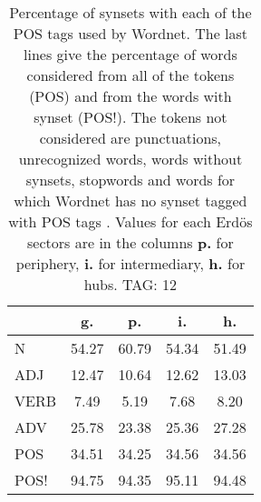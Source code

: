 \begin{table}[h!]
\begin{center}
\begin{tabular}{| l || c | c | c | c |}\hline
 & {\bf g.} & {\bf p.} & {\bf i.} & {\bf h.} \\\hline\hline
N & 54.27  & 60.79  & 54.34  & 51.49 \\\hline
ADJ & 12.47  & 10.64  & 12.62  & 13.03 \\\hline
VERB & 7.49  & 5.19  & 7.68  & 8.20 \\\hline
ADV & 25.78  & 23.38  & 25.36  & 27.28 \\\hline\hline
POS & 34.51  & 34.25  & 34.56  & 34.56 \\\hline
POS! & 94.75  & 94.35  & 95.11  & 94.48 \\\hline
\end{tabular}
\caption{Percentage of synsets with each of the POS tags used by Wordnet. The last lines give the percentage of words considered from all of the tokens (POS) and from the words with synset (POS!). The tokens not considered are punctuations, unrecognized words, words without synsets, stopwords and words for which Wordnet has no synset  tagged with POS tags . Values for each Erd\"os sectors are in the columns {{\bf p.}} for periphery, {{\bf i.}} for intermediary, {{\bf h.}} for hubs. TAG: 12}
\end{center}
\end{table}